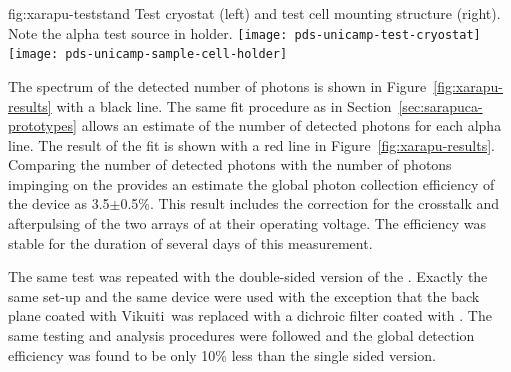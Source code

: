 \begin{dunefigure}{fig:xarapu-teststand}
{Test cryostat (left) and  test cell mounting structure (right).  Note the alpha test source in holder.} 
	\texttt{[image: pds-unicamp-test-cryostat]} \quad
	\texttt{[image: pds-unicamp-sample-cell-holder]}
\end{dunefigure}  



The spectrum of the detected number of photons is shown in Figure~\ref{fig:xarapu-results} with a black line. The same fit procedure as in Section~\ref{sec:sarapuca-prototypes} allows an estimate of the number of detected photons for each alpha line. The result of the fit is shown with a red line in Figure~\ref{fig:xarapu-results}. Comparing the number of detected photons with the number of photons impinging on the  provides an estimate the global photon collection efficiency of the device as 3.5$\pm$0.5\%.
This result includes the correction for the crosstalk and afterpulsing of the two arrays of  at their operating voltage.
The efficiency was stable for the duration of several days of this measurement.

The same test was repeated with the double-sided version of the . Exactly the same set-up and the same device were used with the exception that the back plane coated with Vikuiti\texttrademark\ was replaced with a dichroic filter coated with . The same testing and analysis procedures were followed and the global detection efficiency was found to be only 10\% less than the single sided version.   

